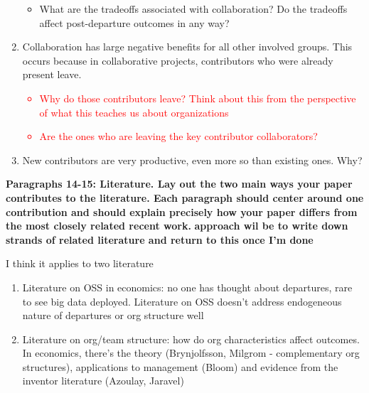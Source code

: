 \documentclass[12pt,notitlepage]{article}
\begin{document}
\begin{enumerate}
{\begin{itemize}
\begin{itemize}
\begin{itemize}
                    \item Do they engage in other forms of responsibility more often, such as reviewing PRs, closing issues, commenting on other's issues? Does this have an effect on outcomes?
                    \item Are they able to do more things independently (either because the departed contributor isn't involved, or becomes less involved) throughout the duration of their collaboration? Does this have an effect on outcomes?
                \end{itemize}
                \item What are the tradeoffs associated with collaboration? Do the tradeoffs affect post-departure outcomes in any way?
            \end{itemize}
        \end{itemize}
    }
    \item Collaboration has large negative benefits for all other involved groups. This occurs because in collaborative projects, contributors who were already present leave. 
    \textcolor{red}{
    \begin{itemize}
            \item Why do those contributors leave? Think about this from the perspective of what this teaches us about organizations
            \item Are the ones who are leaving the key contributor collaborators? 
        \end{itemize}
    }
    \item New contributors are very productive, even more so than existing ones. Why?
\end{enumerate}



\textbf{Paragraphs 14-15: Literature. Lay out the two main ways your paper contributes to the literature. Each paragraph should center around one contribution and should explain precisely how your paper differs from the most closely related recent work.}
\textbf{approach wil be to write down strands of related literature and return to this once I'm done }

I think it applies to two literature
\begin{enumerate}
    \item Literature on OSS in economics: no one has thought about departures, rare to see big data deployed. Literature on OSS doesn't address endogeneous nature of departures or org structure well 
    \item Literature on org/team structure: how do org characteristics affect outcomes. In economics, there's the theory (Brynjolfsson, Milgrom - complementary org structures), applications to management (Bloom) and evidence from the inventor literature (Azoulay, Jaravel)
\end{enumerate}
\end{document}
